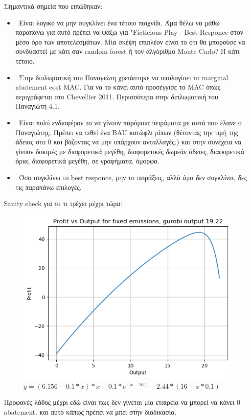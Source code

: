\documentclass[a4paper,twoside,10pt]{article}
\begin{document}
Σημαντικά σημεία που ειπώθηκαν:
\begin{itemize}[label={}]
	\item \lbrack \ \rbrack Είναι λογικό να μην συγκλίνει ένα τέτοιο παιχνίδι. Άμα θέλω να μάθω παραπάνω για αυτό πρέπει να ψάξω για "Ficticious Play - Best Responce στον μέσο όρο των αποτελεσμάτων. 
	Μία σκέψη επιπλέον είναι το ότι θα μπορούσε να συνδυαστεί με κάτι σαν random forest ή τον αλγόριθμο Μonte Carlo? Ή κάτι τέτοιο.
	\item \lbrack \ \rbrack Στην διπλωματική του Παναγιώτη χρειάστηκε να υπολογίσει το marginal abatement cost MAC. Για να το κάνει αυτό προσέγγισε το MAC όπως περιγράφεται στο Chevellier 2011. Περισσότερα στην διπλωματική του Παναγιώτη 4.1. 
	\item \lbrack \ \rbrack Είναι πολύ ενδιαφέρον το να γίνουν παρόμοια πειράματα με αυτά που έλανε ο Παναγιώτης. Πρέπει να τεθεί ένα BAU κατώφλι ρίπων (θέτοντας την τιμή της άδειας στο 0 και βάζοντας να μην υπάρχουν ανταλλαγές.) και στην συνέχεια να γίνουν δοκιμές με διαφορετικά μεγέθη, διαφορετικές δωρεάν άδειες, διαφορετικά όρια, διαφορετικά μεγέθη, σε γραφήματα, όμορφα. 
	\item \lbrack \ \rbrack Όσο συγκλίνει το best responce, μην το πειράξεις, αλλά άμα δεν συγκλίνει, δες τις παραπάνω επιλογές. 
\end{itemize}
Sanity check για το τι τρέχει μέχρι τώρα:
\begin{figure}
	\centering
	\includegraphics[width=0.7\linewidth]{images/random_sanity_check_for_the_gurobi_optimizer}
	\caption{$y = (6.156 - 0.1 * x) * x - 0.1 * e^(x - 16) - 2.44 * (16 - x * 0.1)$}
	\label{fig: Profit vs output Gurobi}
\end{figure}
Προφανές λάθος μέχρι εδώ είναι πως δεν γίνεται μία εταιρεία να μπορεί να κάνει 0 abatement. και αυτό κάπως πρέπει να μπει στην διαδικασία. 
\end{document}
